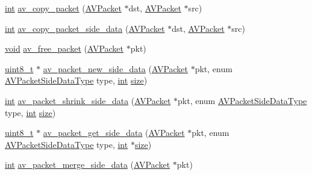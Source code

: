 \begin{DoxyCompactItemize}
\item 
\hyperlink{xmltok_8h_a5a0d4a5641ce434f1d23533f2b2e6653}{int} \hyperlink{group__lavc__packet_gaaa43c60c5af14b713c56d43dfedfdf02}{av\+\_\+copy\+\_\+packet} (\hyperlink{struct_a_v_packet}{A\+V\+Packet} $\ast$dst, \hyperlink{struct_a_v_packet}{A\+V\+Packet} $\ast$src)
\item 
\hyperlink{xmltok_8h_a5a0d4a5641ce434f1d23533f2b2e6653}{int} \hyperlink{group__lavc__packet_ga263069cd61a00a55dd64deb9fcbfa331}{av\+\_\+copy\+\_\+packet\+\_\+side\+\_\+data} (\hyperlink{struct_a_v_packet}{A\+V\+Packet} $\ast$dst, \hyperlink{struct_a_v_packet}{A\+V\+Packet} $\ast$src)
\item 
\hyperlink{sound_8c_ae35f5844602719cf66324f4de2a658b3}{void} \hyperlink{group__lavc__packet_gae65881462e78f98b268f34661d921ee0}{av\+\_\+free\+\_\+packet} (\hyperlink{struct_a_v_packet}{A\+V\+Packet} $\ast$pkt)
\item 
\hyperlink{lib-src_2ffmpeg_2win32_2stdint_8h_a9a941819355e6f658991890ff66b4b0e}{uint8\+\_\+t} $\ast$ \hyperlink{group__lavc__packet_gac59f9714ac34774b43b3797c80b06c68}{av\+\_\+packet\+\_\+new\+\_\+side\+\_\+data} (\hyperlink{struct_a_v_packet}{A\+V\+Packet} $\ast$pkt, enum \hyperlink{group__lavc__packet_ga9a80bfcacc586b483a973272800edb97}{A\+V\+Packet\+Side\+Data\+Type} type, \hyperlink{xmltok_8h_a5a0d4a5641ce434f1d23533f2b2e6653}{int} \hyperlink{group__lavu__mem_ga854352f53b148adc24983a58a1866d66}{size})
\item 
\hyperlink{xmltok_8h_a5a0d4a5641ce434f1d23533f2b2e6653}{int} \hyperlink{group__lavc__packet_gaefae1892a6e7de60928da347ec74f460}{av\+\_\+packet\+\_\+shrink\+\_\+side\+\_\+data} (\hyperlink{struct_a_v_packet}{A\+V\+Packet} $\ast$pkt, enum \hyperlink{group__lavc__packet_ga9a80bfcacc586b483a973272800edb97}{A\+V\+Packet\+Side\+Data\+Type} type, \hyperlink{xmltok_8h_a5a0d4a5641ce434f1d23533f2b2e6653}{int} \hyperlink{group__lavu__mem_ga854352f53b148adc24983a58a1866d66}{size})
\item 
\hyperlink{lib-src_2ffmpeg_2win32_2stdint_8h_a9a941819355e6f658991890ff66b4b0e}{uint8\+\_\+t} $\ast$ \hyperlink{group__lavc__packet_ga13f8dba52eed886ad2c7d2510da289f8}{av\+\_\+packet\+\_\+get\+\_\+side\+\_\+data} (\hyperlink{struct_a_v_packet}{A\+V\+Packet} $\ast$pkt, enum \hyperlink{group__lavc__packet_ga9a80bfcacc586b483a973272800edb97}{A\+V\+Packet\+Side\+Data\+Type} type, \hyperlink{xmltok_8h_a5a0d4a5641ce434f1d23533f2b2e6653}{int} $\ast$\hyperlink{group__lavu__mem_ga854352f53b148adc24983a58a1866d66}{size})
\item 
\hyperlink{xmltok_8h_a5a0d4a5641ce434f1d23533f2b2e6653}{int} \hyperlink{group__lavc__packet_gae27195b8483cfe56407a664af5b52951}{av\+\_\+packet\+\_\+merge\+\_\+side\+\_\+data} (\hyperlink{struct_a_v_packet}{A\+V\+Packet} $\ast$pkt)

\end{DoxyCompactItemize}
